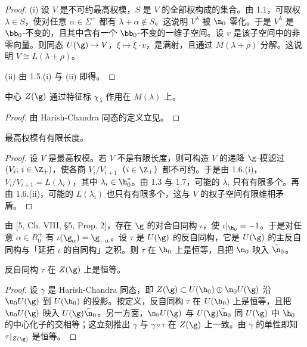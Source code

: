 \begin{proof}
(i) 设 $V$ 是不可约最高权模，$S$ 是 $V$ 的全部权构成的集合。由 1.1，可取权 $\lambda\in S$，使对任意 $\alpha\in\Sigma^+$ 都有 $\lambda+\alpha\notin S$。这说明 $V^\lambda$ 被 $\n_0$ 零化。于是 $V^\lambda$ 是 $\bb_0$-不变的，且其中含有一个 $\bb_0$-不变的一维子空间。设 $v$ 是该子空间中的非零向量。则同态 $U(\g)\to V$，$\xi\mapsto\xi\cdot v$，是满射，且通过 $M(\lambda+\rho)$ 分解。这说明 $V\cong L(\lambda+\rho)$。

(ii) 由 1.5.(i) 与 (ii) 即得。
\end{proof}

\begin{lemma}\label{lem:05.1.7}
中心 $Z(\g)$ 通过特征标 $\chi_\lambda$ 作用在 $M(\lambda)$ 上。
\end{lemma}

\begin{proof}
由 Harish-Chandra 同态的定义立见。
\end{proof}

\begin{proposition}\label{prop:05.1.8}
最高权模有有限长度。
\end{proposition}

\begin{proof}
设 $V$ 是最高权模。若 $V$ 不是有限长度，则可构造 $V$ 的递降 $\g$-模滤过 $(V_i;\,i\in\Z_+)$，使各商 $V_i/V_{i+1}$（$i\in\Z_+$）都不可约。于是由 1.6.(i)，$V_i/V_{i+1}=L(\lambda_i)$，其中 $\lambda_i\in\h_0^*$。由 1.3 与 1.7，可能的 $\lambda_i$ 只有有限多个。再由 1.6.(ii)，可能的 $L(\lambda_i)$ 也只有有限多个，这与 $V$ 的权子空间有限维相矛盾。
\end{proof}

由 [5, Ch. VIII, \S 5, Prop. 2]，存在 $\g$ 的对合自同构 $\iota$，使 $\iota|_{\h_0}=-1$。于是对任意 $\alpha\in R_0^+$ 有 $\iota(\g_\alpha)=\g_{-\alpha}$。设 $\tau$ 是 $U(\g)$ 的反自同构，它是 $U(\g)$ 的主反自同构与「延拓 $\iota$ 的自同构」之积。则 $\tau$ 在 $\h_0$ 上是恒等，且把 $\n_0$ 映入 $\bar{\n}_0$。

\begin{lemma}\label{lem:05.1.9}
反自同构 $\tau$ 在 $Z(\g)$ 上是恒等。
\end{lemma}

\begin{proof}
设 $\gamma$ 是 Harish-Chandra 同态，即 $Z(\g)\subset U(\h_0)\oplus\n_0U(\g)$ 沿 $\n_0U(\g)$ 到 $U(\h_0)$ 的投影。按定义，反自同构 $\tau$ 在 $U(\h_0)$ 上是恒等，且把 $\n_0U(\g)$ 映入 $U(\g)\bar{\n}_0$。另一方面，$\n_0U(\g)$ 与 $U(\g)\bar{\n}_0$ 同 $U(\g)$ 中 $\h_0$ 的中心化子的交相等；这立刻推出 $\gamma$ 与 $\gamma\circ\tau$ 在 $Z(\g)$ 上一致。由 $\gamma$ 的单性即知 $\tau|_{Z(\g)}$ 是恒等。
\end{proof}

